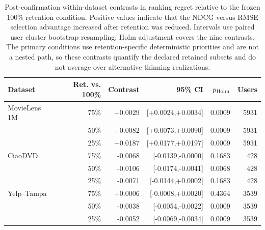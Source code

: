 \begin{table}[H]
\centering
\caption{Post-confirmation within-dataset contrasts in ranking regret relative to the frozen 100\% retention condition. Positive values indicate that the NDCG versus RMSE selection advantage increased after retention was reduced. Intervals use paired user cluster bootstrap resampling; Holm adjustment covers the nine contrasts. The primary conditions use retention-specific deterministic priorities and are not a nested path, so these contrasts quantify the declared retained subsets and do not average over alternative thinning realizations.}
\label{tab:retention-contrasts}
\small
\begin{tabular}{@{}lrrrrr@{}}
\toprule
Dataset & Ret. vs. 100\% & Contrast & 95\% CI & $p_{\rm Holm}$ & Users \\
\midrule
MovieLens 1M & 75\% & +0.0029 & [+0.0024,+0.0034] & 0.0009 & 5931 \\
 & 50\% & +0.0082 & [+0.0073,+0.0090] & 0.0009 & 5931 \\
 & 25\% & +0.0187 & [+0.0177,+0.0197] & 0.0009 & 5931 \\
\addlinespace
CiaoDVD & 75\% & -0.0068 & [-0.0139,-0.0000] & 0.1683 & 428 \\
 & 50\% & -0.0106 & [-0.0174,-0.0041] & 0.0068 & 428 \\
 & 25\% & -0.0071 & [-0.0144,+0.0002] & 0.1683 & 428 \\
\addlinespace
Yelp--Tampa & 75\% & +0.0006 & [-0.0008,+0.0020] & 0.4364 & 3539 \\
 & 50\% & -0.0038 & [-0.0054,-0.0022] & 0.0009 & 3539 \\
 & 25\% & -0.0052 & [-0.0069,-0.0034] & 0.0009 & 3539 \\
\bottomrule
\end{tabular}
\end{table}
